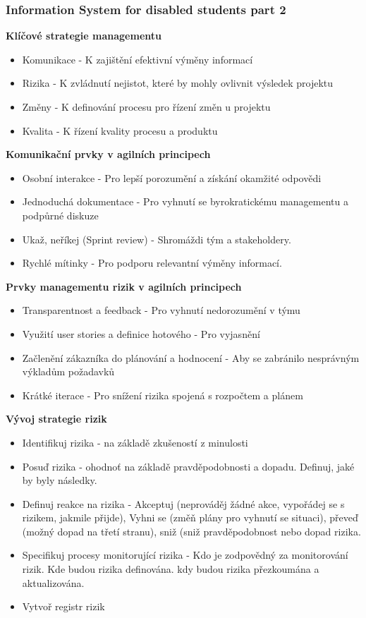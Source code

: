 \documentclass[11pt,a4paper]{article}
\begin{document}
    \subsubsection{Information System for disabled students part 2 \cite{pres-4a}}
        \textbf{Klíčové strategie managementu}
        \begin{itemize}
            \item Komunikace - K zajištění efektivní výměny informací
            \item Rizika - K zvládnutí nejistot, které by mohly ovlivnit výsledek projektu
            \item Změny - K definování procesu pro řízení změn u projektu
            \item Kvalita - K řízení kvality procesu a produktu
        \end{itemize}
        \textbf{Komunikační prvky v agilních principech}
        \begin{itemize}
            \item Osobní interakce - Pro lepší porozumění a získání okamžité odpovědi
            \item Jednoduchá dokumentace - Pro vyhnutí se byrokratickému managementu a podpůrné diskuze
            \item Ukaž, neříkej (Sprint review) - Shromáždi tým a stakeholdery.
            \item Rychlé mítinky - Pro podporu relevantní výměny informací.
        \end{itemize}
        \textbf{Prvky managementu rizik v agilních principech}
        \begin{itemize}
            \item Transparentnost a feedback - Pro vyhnutí nedorozumění v týmu
            \item Využití user stories a definice hotového - Pro vyjasnění
            \item Začlenění zákazníka do plánování a hodnocení - Aby se zabránilo nesprávným výkladům požadavků
            \item Krátké iterace - Pro snížení rizika spojená s rozpočtem a plánem
        \end{itemize}
        \textbf{Vývoj strategie rizik}
        \begin{itemize}
            \item Identifikuj rizika - na základě zkušeností z minulosti
            \item Posuď rizika - ohodnoť na základě pravděpodobnosti a dopadu. Definuj, jaké by byly následky.
            \item Definuj reakce na rizika - Akceptuj (neprováděj žádné akce, vypořádej se s rizikem, jakmile přijde), Vyhni se (změň plány pro vyhnutí se situaci), převeď (možný dopad na třetí stranu), sniž (sniž pravděpodobnost nebo dopad rizika.
            \item Specifikuj procesy monitorující rizika - Kdo je zodpovědný za monitorování rizik. Kde budou rizika definována. kdy budou rizika přezkoumána a aktualizována.
            \item Vytvoř registr rizik
        \end{itemize}
\end{document}
